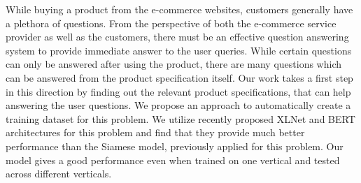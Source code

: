 While buying a product from the e-commerce websites, customers generally have a plethora of questions. From the perspective of both the e-commerce service provider as well as the customers, there must be an effective question answering system to provide immediate answer to the user queries. While certain questions can only be answered after using the product, there are many questions which can be answered from the product specification itself. Our work takes a first step in this direction by finding out the relevant product specifications, that can help answering the user questions. We propose an approach to automatically create a training dataset for this problem. We utilize recently proposed XLNet and BERT architectures for this problem and find that they provide much better performance than the Siamese model, previously applied for this problem. Our model gives a good performance even when trained on one vertical and tested across different verticals.
